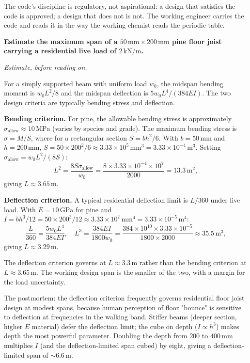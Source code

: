 The code's discipline is regulatory, not aspirational: a design that
satisfies the code is approved; a design that does not is not. The
working engineer carries the code and reads it in the way the
working chemist reads the periodic table.

\begin{estimation}
\textbf{Estimate the maximum span of a $50\,\si{\milli\meter} \times
200\,\si{\milli\meter}$ pine floor joist carrying a residential
live load of $2\,\text{kN}/\text{m}$.}

\smallskip
\textit{Estimate, before reading on.}

\smallskip
For a simply supported beam with uniform load $w_0$, the midspan
bending moment is $w_0 L^2 / 8$ and the midspan deflection is
$5 w_0 L^4 / (384 EI)$. The two design criteria are typically
bending stress and deflection.

\textbf{Bending criterion.} For pine, the allowable bending stress
is approximately $\sigma_{\text{allow}} \approx 10\,\text{MPa}$
(varies by species and grade). The maximum bending stress is
$\sigma = M/S$, where for a rectangular section $S = bh^2/6$. With
$b = 50\,\si{\milli\meter}$ and $h = 200\,\si{\milli\meter}$,
$S = 50 \times 200^2/6 \approx 3.33 \times 10^5\,\si{\milli\meter
\cubed} = 3.33 \times 10^{-4}\,\si{\meter\cubed}$. Setting
$\sigma_{\text{allow}} = w_0 L^2 / (8 S)$:
\[
L^2 = \frac{8 S \sigma_{\text{allow}}}{w_0} = \frac{8 \times 3.33
\times 10^{-4} \times 10^7}{2000} = 13.3\,\si{\meter\squared},
\]
giving $L \approx 3.65\,\si{\meter}$.

\textbf{Deflection criterion.} A typical residential deflection limit
is $L/360$ under live load. With $E = 10\,\text{GPa}$ for pine and
$I = bh^3/12 = 50 \times 200^3/12 \approx 3.33 \times 10^7\,\si{
\milli\meter\tothe{4}} = 3.33 \times 10^{-5}\,\si{\meter\tothe{4}}$:
\[
\frac{L}{360} = \frac{5 w_0 L^4}{384 EI}, \quad L^3 = \frac{384 EI}{
1800 w_0} = \frac{384 \times 10^{10} \times 3.33 \times 10^{-5}}{
1800 \times 2000} \approx 35.5\,\si{\meter\cubed},
\]
giving $L \approx 3.29\,\si{\meter}$.

The deflection criterion governs at $L \approx 3.3\,\si{\meter}$
rather than the bending criterion at $L \approx 3.65\,\si{\meter}$.
The working design span is the smaller of the two, with a margin
for the load uncertainty.

The postmortem: the deflection criterion frequently governs
residential floor joist design at modest spans, because human
perception of floor "bounce" is sensitive to deflection at frequencies
in the walking band. Stiffer beams (deeper section, higher $E$
material) defer the deflection limit; the cube on depth ($I \propto
h^3$) makes depth the most powerful parameter. Doubling the depth
from $200$ to $400\,\si{\milli\meter}$ multiplies $I$ (and the
deflection-limited span cubed) by eight, giving a deflection-limited
span of $\sim 6.6\,\si{\meter}$.
\end{estimation}

